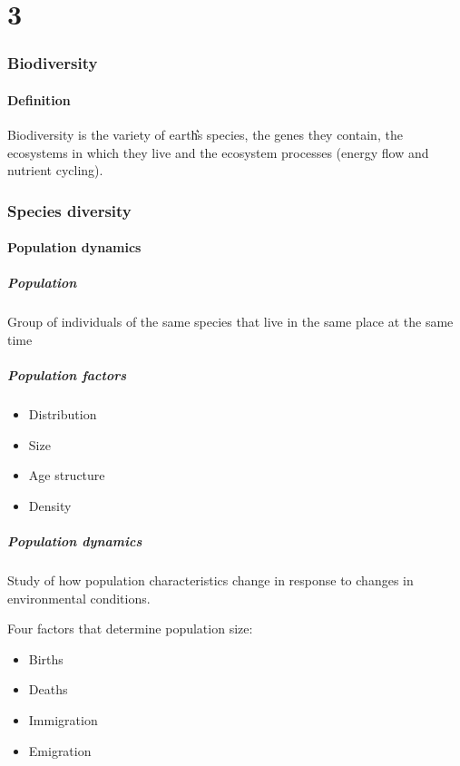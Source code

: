 \documentclass{article}
\begin{document}
\part{3}
\section{Biodiversity}
\subsection{Definition}
Biodiversity is the variety of earth͛s species, the genes they contain, the ecosystems in which they
live and the ecosystem processes (energy flow and nutrient cycling).

\todo

\section{Species diversity}
\subsection{Population dynamics}
\subsubsection{Population}
Group of individuals of the same species that live in the same place at the same time

\subsubsection{Population factors}
\begin{itemize}
    \item Distribution
    \item Size
    \item Age structure
    \item Density
\end{itemize}

\subsubsection{Population dynamics}
Study of how population characteristics change in response to changes in environmental
conditions.

Four factors that determine population size:
\begin{itemize}
    \item Births
    \item Deaths
    \item Immigration
    \item Emigration
\end{itemize}
\end{document}
